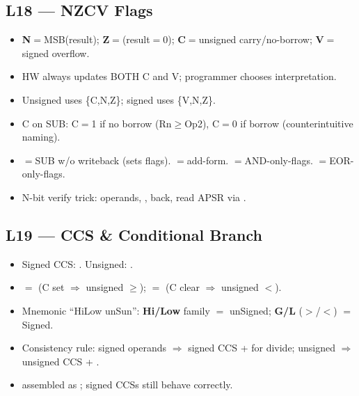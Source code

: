 \subsection{L18 --- NZCV Flags}
\begin{itemize}
\item \textbf{N}$=$MSB(result); \textbf{Z}$=$(result$=$0); \textbf{C}$=$unsigned carry/no-borrow; \textbf{V}$=$signed overflow.
\item HW always updates BOTH C and V; programmer chooses interpretation.
\item Unsigned uses \{C,N,Z\}; signed uses \{V,N,Z\}.
\item C on SUB: C$=$1 if no borrow (Rn$\ge$Op2), C$=$0 if borrow (counterintuitive naming).
\item {}$=$SUB w/o writeback (sets flags). $=$add-form. $=$AND-only-flags. $=$EOR-only-flags.
\item N-bit verify trick:  operands, ,  back, read APSR via .
\end{itemize}

\subsection{L19 --- CCS \& Conditional Branch}
\begin{itemize}
\item Signed CCS: . Unsigned: .
\item {}$=$ (C set $\Rightarrow$ unsigned $\ge$); $=$ (C clear $\Rightarrow$ unsigned $<$).
\item Mnemonic ``HiLow unSun'': \textbf{Hi/Low} family $=$ unSigned; \textbf{G/L} ($>$/$<$) $=$ Signed.
\item Consistency rule: signed operands $\Rightarrow$ signed CCS +  for divide; unsigned $\Rightarrow$ unsigned CCS + .
\item {} assembled as ; signed CCSs still behave correctly.
\end{itemize}

